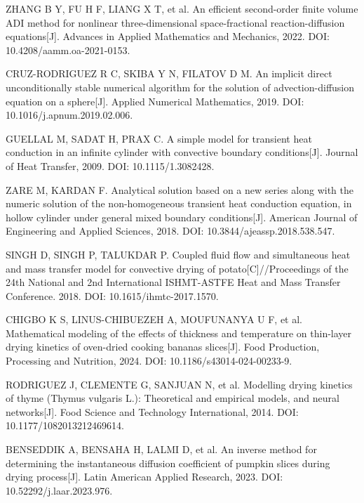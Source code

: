 ZHANG B Y, FU H F, LIANG X T, et al. An efficient second-order finite volume
ADI method for nonlinear three-dimensional space-fractional reaction-diffusion
equations[J]. Advances in Applied Mathematics and Mechanics, 2022.
DOI: 10.4208/aamm.oa-2021-0153.

CRUZ-RODRIGUEZ R C, SKIBA Y N, FILATOV D M. An implicit direct unconditionally
stable numerical algorithm for the solution of advection-diffusion equation on
a sphere[J]. Applied Numerical Mathematics, 2019.
DOI: 10.1016/j.apnum.2019.02.006.

GUELLAL M, SADAT H, PRAX C. A simple model for transient heat conduction in an
infinite cylinder with convective boundary conditions[J]. Journal of Heat
Transfer, 2009. DOI: 10.1115/1.3082428.

ZARE M, KARDAN F. Analytical solution based on a new series along with the
numeric solution of the non-homogeneous transient heat conduction equation, in
hollow cylinder under general mixed boundary conditions[J]. American Journal of
Engineering and Applied Sciences, 2018. DOI: 10.3844/ajeassp.2018.538.547.

SINGH D, SINGH P, TALUKDAR P. Coupled fluid flow and simultaneous heat and mass
transfer model for convective drying of potato[C]//Proceedings of the 24th
National and 2nd International ISHMT-ASTFE Heat and Mass Transfer Conference.
2018. DOI: 10.1615/ihmtc-2017.1570.

CHIGBO K S, LINUS-CHIBUEZEH A, MOUFUNANYA U F, et al. Mathematical modeling of
the effects of thickness and temperature on thin-layer drying kinetics of
oven-dried cooking bananas slices[J]. Food Production, Processing and
Nutrition, 2024. DOI: 10.1186/s43014-024-00233-9.

RODRIGUEZ J, CLEMENTE G, SANJUAN N, et al. Modelling drying kinetics of thyme
(Thymus vulgaris L.): Theoretical and empirical models, and neural networks[J].
Food Science and Technology International, 2014.
DOI: 10.1177/1082013212469614.

BENSEDDIK A, BENSAHA H, LALMI D, et al. An inverse method for determining the
instantaneous diffusion coefficient of pumpkin slices during drying process[J].
Latin American Applied Research, 2023. DOI: 10.52292/j.laar.2023.976.
